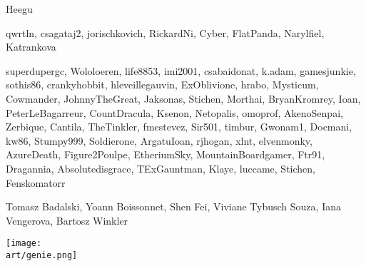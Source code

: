 
\bigbreak

\begin{multicols*}{2}

Heegu\par
{}
\pl{}
qwrtln, csagataj2, jorischkovich, RickardNi, Cyber, FlatPanda, Narylfiel, Katrankova\par
{}
\pl{}
superdupergc, Wololoeren, life8853, imi2001, csabaidonat, k.adam, gamesjunkie, sothis86, cranky\textunderscore hobbit, hleveillegauvin, ExOblivione, hrabo, Mysticum, Cowmander, JohnnyTheGreat, Jaksonas, Stichen, Morthai, BryanKromrey, Ioan, PeterLeBagarreur, \textunderscore Count\textunderscore Dracula\textunderscore , \space Ksenon, Netopalis, omoprof, AkenoSenpai, Zerbique, Cantila, TheTinkler, fmestevez, Sir501, timbur, Gwonam1, Docmani, kw86, Stumpy999, Soldierone, Argatu\textunderscore Ioan, rj\textunderscore hogan, xlnt, elvenmonky, AzureDeath, Figure2Poulpe, EtheriumSky, MountainBoardgamer, Ftr91, Dragannia, Absolutedisgrace, TExGauntman, Klaye, luccame, Stichen, Fenskomatorr
\par

\pl{}
Tomasz Badalski, Yoann Boissonnet, Shen Fei, Viviane Tybusch Souza, Iana Vengerova, Bartosz Winkler


\columnbreak

\vspace*{\fill}

\texttt{[image: \\art/genie.png]}

\vspace*{\fill}

\end{multicols*}

